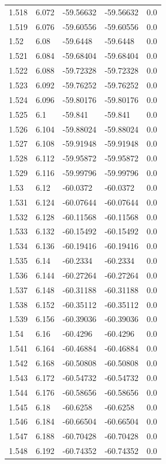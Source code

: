 \begin{tabular}{lllll}
1.518 & 6.072 & -59.56632 & -59.56632 & 0.0 \\
1.519 & 6.076 & -59.60556 & -59.60556 & 0.0 \\
1.52 & 6.08 & -59.6448 & -59.6448 & 0.0 \\
1.521 & 6.084 & -59.68404 & -59.68404 & 0.0 \\
1.522 & 6.088 & -59.72328 & -59.72328 & 0.0 \\
1.523 & 6.092 & -59.76252 & -59.76252 & 0.0 \\
1.524 & 6.096 & -59.80176 & -59.80176 & 0.0 \\
1.525 & 6.1 & -59.841 & -59.841 & 0.0 \\
1.526 & 6.104 & -59.88024 & -59.88024 & 0.0 \\
1.527 & 6.108 & -59.91948 & -59.91948 & 0.0 \\
1.528 & 6.112 & -59.95872 & -59.95872 & 0.0 \\
1.529 & 6.116 & -59.99796 & -59.99796 & 0.0 \\
1.53 & 6.12 & -60.0372 & -60.0372 & 0.0 \\
1.531 & 6.124 & -60.07644 & -60.07644 & 0.0 \\
1.532 & 6.128 & -60.11568 & -60.11568 & 0.0 \\
1.533 & 6.132 & -60.15492 & -60.15492 & 0.0 \\
1.534 & 6.136 & -60.19416 & -60.19416 & 0.0 \\
1.535 & 6.14 & -60.2334 & -60.2334 & 0.0 \\
1.536 & 6.144 & -60.27264 & -60.27264 & 0.0 \\
1.537 & 6.148 & -60.31188 & -60.31188 & 0.0 \\
1.538 & 6.152 & -60.35112 & -60.35112 & 0.0 \\
1.539 & 6.156 & -60.39036 & -60.39036 & 0.0 \\
1.54 & 6.16 & -60.4296 & -60.4296 & 0.0 \\
1.541 & 6.164 & -60.46884 & -60.46884 & 0.0 \\
1.542 & 6.168 & -60.50808 & -60.50808 & 0.0 \\
1.543 & 6.172 & -60.54732 & -60.54732 & 0.0 \\
1.544 & 6.176 & -60.58656 & -60.58656 & 0.0 \\
1.545 & 6.18 & -60.6258 & -60.6258 & 0.0 \\
1.546 & 6.184 & -60.66504 & -60.66504 & 0.0 \\
1.547 & 6.188 & -60.70428 & -60.70428 & 0.0 \\
1.548 & 6.192 & -60.74352 & -60.74352 & 0.0 \\

\end{tabular}

